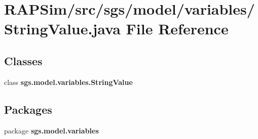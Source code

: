\section{R\-A\-P\-Sim/src/sgs/model/variables/\-String\-Value.java File Reference}
\label{_string_value_8java}
\subsection*{Classes}
\begin{DoxyCompactItemize}
\item 
class {\bf sgs.\-model.\-variables.\-String\-Value}
\end{DoxyCompactItemize}
\subsection*{Packages}
\begin{DoxyCompactItemize}
\item 
package {\bf sgs.\-model.\-variables}
\end{DoxyCompactItemize}
